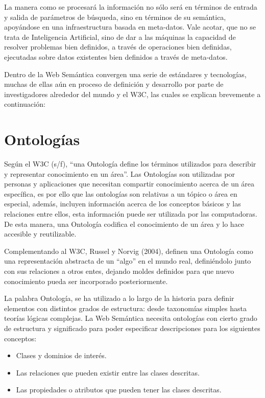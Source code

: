 La manera como se procesará la información no sólo será en términos de entrada y salida de parámetros de búsqueda, sino en términos de su semántica, apoyándose en una infraestructura basada en meta-datos. Vale acotar, que no se trata de Inteligencia Artificial, sino de dar a las máquinas la capacidad de resolver problemas bien definidos, a través de operaciones bien definidas, ejecutadas sobre datos existentes bien definidos a través de meta-datos.

Dentro de la Web Semántica convergen una serie de estándares y tecnologías, muchas de ellas aún en proceso de definición y desarrollo por parte de investigadores alrededor del mundo y el W3C, las cuales se explican brevemente a continuación:

\section{Ontologías}

Según el W3C (s/f), ``una Ontología define los términos utilizados para describir y representar conocimiento en un área''. Las Ontologías son utilizadas por personas y aplicaciones que necesitan compartir conocimiento acerca de un área específica, es por ello que las ontologías son relativas a un tópico o área en especial, además, incluyen información acerca de los conceptos básicos y las relaciones entre ellos, esta información puede ser utilizada por las computadoras. De esta manera, una Ontología codifica el conocimiento de un área y lo hace accesible y reutilizable.

Complementando al W3C, Russel y Norvig (2004), definen una Ontología como una representación abstracta de un ``algo'' en el mundo real, definiéndolo junto con sus relaciones a otros entes, dejando moldes definidos para que nuevo conocimiento pueda ser incorporado posteriormente.

La palabra Ontología, se ha utilizado a lo largo de la historia para definir elementos con distintos grados de estructura: desde taxonomías simples hasta teorías lógicas complejas. La Web Semántica necesita ontologías con cierto grado de estructura y significado para poder especificar descripciones para los siguientes conceptos:

\begin{itemize}
\item Clases y dominios de interés.
\item Las relaciones que pueden existir entre las clases descritas.
\item Las propiedades o atributos que pueden tener las clases descritas.
\end{itemize}

